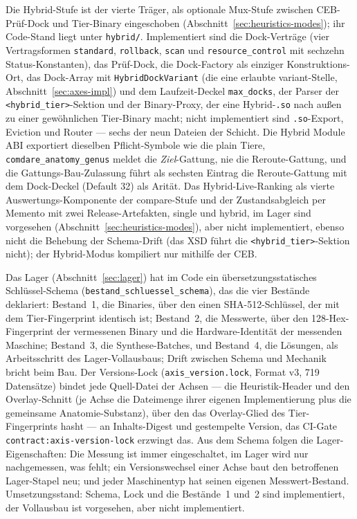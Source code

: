 \begin{nurkurz}
Die Hybrid-Stufe ist der vierte Träger, als optionale Mux-Stufe zwischen CEB-Prüf-Dock und Tier-Binary
eingeschoben (Abschnitt~\ref{sec:heuristics-modes}); ihr Code-Stand liegt
unter \texttt{hybrid/}. Implementiert sind die Dock-Verträge (vier Vertragsformen \texttt{standard},
\texttt{rollback}, \texttt{scan} und \texttt{resource\_control} mit sechzehn Status-Konstanten), das
Prüf-Dock, die Dock-Factory als einziger Konstruktions-Ort, das Dock-Array mit \texttt{HybridDockVariant}
(die eine erlaubte variant-Stelle, Abschnitt~\ref{sec:axes-impl}) und dem Laufzeit-Deckel
\texttt{max\_docks}, der Parser der \texttt{<hybrid\_tier>}-Sektion und der Binary-Proxy, der eine
Hybrid-\texttt{.so} nach außen zu einer gewöhnlichen Tier-Binary macht; nicht implementiert sind \texttt{.so}-Export,
Eviction und Router --- sechs der neun Dateien der Schicht. Die Hybrid Module ABI exportiert dieselben
Pflicht-Symbole wie die plain Tiere, \texttt{comdare\_anatomy\_genus} meldet die \emph{Ziel}-Gattung, nie
die Reroute-Gattung, und die Gattungs-Bau-Zulassung führt als sechsten Eintrag die Reroute-Gattung mit dem
Dock-Deckel (Default 32) als Arität. Das Hybrid-Live-Ranking als vierte Auswertungs-Komponente der
compare-Stufe und der Zustandsabgleich per Memento mit zwei Release-Artefakten, single und hybrid, im
Lager sind vorgesehen (Abschnitt~\ref{sec:heuristics-modes}), aber nicht implementiert, ebenso nicht die
Behebung der Schema-Drift (das XSD führt die \texttt{<hybrid\_tier>}-Sektion nicht); der Hybrid-Modus
kompiliert nur mithilfe der CEB\@.

Das Lager (Abschnitt~\ref{sec:lager}) hat im Code ein übersetzungsstatisches Schlüssel-Schema
(\texttt{bestand\_\allowbreak{}schluessel\_\allowbreak{}schema}), das die vier Bestände deklariert:
Bestand~1, die Binaries, über den einen SHA-512-Schlüssel, der mit dem Tier-Fingerprint identisch ist;
Bestand~2, die Messwerte, über den 128-Hex-Fingerprint der vermessenen Binary und die Hardware-Identität
der messenden Maschine; Bestand~3, die Synthese-Batches, und Bestand~4, die Lösungen, als Arbeitsschritt
des Lager-Vollausbaus; Drift zwischen Schema und Mechanik bricht beim Bau. Der Versions-Lock
(\texttt{axis\_version.lock}, Format v3, 719 Datensätze) bindet jede Quell-Datei der Achsen --- die
Heuristik-Header und den Overlay-Schnitt (je Achse die Dateimenge ihrer eigenen Implementierung plus die
gemeinsame Anatomie-Substanz), über den das Overlay-Glied des Tier-Fingerprints hasht --- an
Inhalts-Digest und gestempelte Version, das CI-Gate \texttt{contract:axis-version-lock} erzwingt das. Aus
dem Schema folgen die Lager-Eigenschaften: Die Messung ist immer eingeschaltet, im Lager wird nur
nachgemessen, was fehlt; ein Versionswechsel einer Achse baut den betroffenen Lager-Stapel neu; und jeder
Maschinentyp hat seinen eigenen Messwert-Bestand. Umsetzungsstand: Schema, Lock und die Bestände~1 und~2
sind implementiert, der Vollausbau ist vorgesehen, aber nicht implementiert.
\end{nurkurz}

